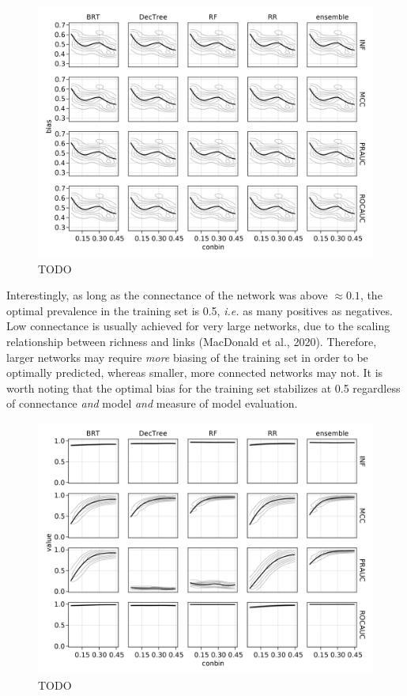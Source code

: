 \documentclass[10pt,oneside]{article}
\makeatletter
\def\maxwidth{\ifdim\Gin@nat@width>\linewidth\linewidth
\else\Gin@nat@width\fi}
\let\Oldincludegraphics\includegraphics
\renewcommand{\includegraphics}[1]{\Oldincludegraphics[width=\maxwidth]{#1}}
\makeatother
\begin{document}
\begin{figure}
\hypertarget{fig:optimbias}{%
\centering
\includegraphics{figures/optim_bias.png}
\caption{TODO}\label{fig:optimbias}
}
\end{figure}

Interestingly, as long as the connectance of the network was above
\(\approx 0.1\), the optimal prevalence in the training set is 0.5,
\emph{i.e.} as many positives as negatives. Low connectance is usually
achieved for very large networks, due to the scaling relationship
between richness and links (MacDonald et al., 2020). Therefore, larger
networks may require \emph{more} biasing of the training set in order to
be optimally predicted, whereas smaller, more connected networks may
not. It is worth noting that the optimal bias for the training set
stabilizes at 0.5 regardless of connectance \emph{and} model \emph{and}
measure of model evaluation.

\begin{figure}
\hypertarget{fig:optimperf}{%
\centering
\includegraphics{figures/optim_perf.png}
\caption{TODO}\label{fig:optimperf}
}
\end{figure}
\end{document}
